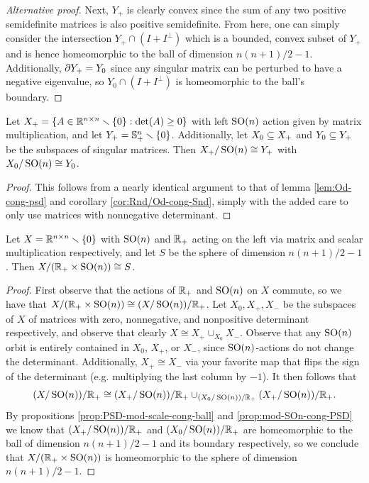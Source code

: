 \begin{proposition}
\begin{proof}[Alternative proof]
        Next, $Y_+$ is clearly convex since the sum of any two positive semidefinite matrices is also positive semidefinite.
        From here, one can simply consider the intersection $Y_+ \cap (I + I^\perp)$ which is a bounded, convex subset of $Y_+$ and is hence homeomorphic to the ball of dimension $n(n+1)/2 - 1$.
        Additionally, $\partial Y_+ = Y_0$ since any singular matrix can be perturbed to have a negative eigenvalue, so $Y_0 \cap (I + I^\perp)$ is homeomorphic to the ball's boundary.
    \end{proof}
\end{proposition}

\begin{proposition}\label{prop:mod-SOn-cong-PSD}
    Let  $X_+ = \left\{ A \in \mathbb{R}^{n \times n} \smallsetminus \left\{ 0 \right\} : \det(A) \geq 0 \right\}$ with left $\operatorname{SO}(n)$ action given by matrix multiplication, and let $Y_+ = \mathbb{S}^n_+ \smallsetminus \left\{ 0 \right\}$.
    Additionally, let $X_0 \subseteq X_+$ and $Y_0 \subseteq Y_+$ be the subspaces of singular matrices.
    Then $X_+ / \operatorname{SO}(n) \cong Y_+$ with $X_0 / \operatorname{SO}(n) \cong Y_0$.
    \begin{proof}
        This follows from a nearly identical argument to that of lemma \ref{lem:Od-cong-psd} and corollary \ref{cor:Rnd/Od-cong-Snd}, simply with the added care to only use matrices with nonnegative determinant.
    \end{proof}
\end{proposition}

\begin{theorem}[Casson]\label{thm:Casson}
    Let $X = \mathbb{R}^{n \times n} \smallsetminus \left\{ 0 \right\}$ with $\operatorname{SO}(n)$ and $\mathbb{R}_+$ acting on the left via matrix and scalar multiplication respectively, and let $S$ be the sphere of dimension $n(n+1)/2 - 1$.
    Then $X / (\mathbb{R}_+ \times \operatorname{SO}(n)) \cong S$.
    \begin{proof}
        First observe that the actions of $\mathbb{R}_+$ and $\operatorname{SO}(n)$ on $X$ commute, so we have that
        $X / (\mathbb{R}_+ \times \operatorname{SO}(n)) \cong (X / \operatorname{SO}(n)) / \mathbb{R}_+$.
        Let $X_0,X_+,X_-$ be the subspaces of $X$ of matrices with zero, nonnegative, and nonpositive determinant respectively, and observe that clearly $X \cong X_+ \cup_{X_0} X_-$.
        Observe that any $\operatorname{SO}(n)$ orbit is entirely contained in $X_0$, $X_+$, or $X_-$, since $\operatorname{SO}(n)$-actions do not change the determinant.
        Additionally, $X_+ \cong X_-$ via your favorite map that flips the sign of the determinant (e.g. multiplying the last column by $-1$).
        It then follows that
        \[
            (X / \operatorname{SO}(n)) / \mathbb{R}_+
            \cong (X_+ / \operatorname{SO}(n)) / \mathbb{R}_+
            \cup_{(X_0 / \operatorname{SO}(n)) / \mathbb{R}_+}
             (X_+ / \operatorname{SO}(n)) / \mathbb{R}_+.
        \]
        By propositions \ref{prop:PSD-mod-scale-cong-ball} and \ref{prop:mod-SOn-cong-PSD} we know that $(X_+ / \operatorname{SO}(n))/\mathbb{R}_+$ and $(X_0 / \operatorname{SO}(n))/\mathbb{R}_+$ are homeomorphic to the ball of dimension $n(n+1)/2 - 1$ and its boundary respectively, so we conclude that $X / (\mathbb{R}_+ \times \operatorname{SO}(n))$ is homeomorphic to the sphere of dimension $n(n+1)/2 - 1$.
    \end{proof}
\end{theorem}

